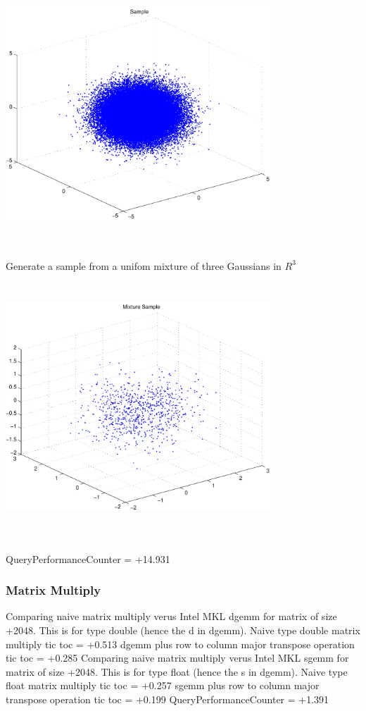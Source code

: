 \documentclass[9pt]{article}
\theoremstyle{plain}
\theoremstyle{definition}
\theoremstyle{remark}
\numberwithin{equation}{section}
\begin{document}
\includegraphics[width=10.0cm,height=10.0cm]{R_3_Normal.pdf}

Generate a sample from a unifom mixture of three Gaussians in $R^3$
\includegraphics[width=10.0cm,height=10.0cm]{R_3_Normal_Mixture.pdf}

QueryPerformanceCounter  =  +14.931
\subsubsection{Matrix Multiply}
Comparing naive matrix multiply verus Intel MKL dgemm for matrix of size +2048.
This is for type double (hence the d in dgemm).
Naive type double matrix multiply tic toc  =  +0.513
dgemm plus row to column major transpose operation tic toc  =  +0.285
Comparing naive matrix multiply verus Intel MKL sgemm for matrix of size +2048.
This is for type float (hence the s in dgemm).
Naive type float matrix multiply tic toc  =  +0.257
sgemm plus row to column major transpose operation tic toc  =  +0.199
QueryPerformanceCounter  =  +1.391
\end{document}
